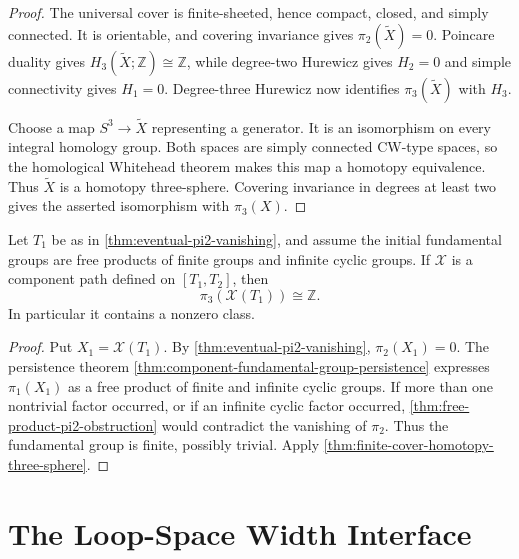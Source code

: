 \begin{proof}
The universal cover is finite-sheeted, hence compact, closed, and simply
connected.  It is orientable, and covering invariance gives
$\pi_2(\widetilde X)=0$.  Poincare duality gives
$H_3(\widetilde X;\mathbb Z)\cong\mathbb Z$, while degree-two Hurewicz gives
$H_2=0$ and simple connectivity gives $H_1=0$.  Degree-three Hurewicz now
identifies $\pi_3(\widetilde X)$ with $H_3$.

Choose a map $S^3\to\widetilde X$ representing a generator.  It is an
isomorphism on every integral homology group.  Both spaces are simply
connected CW-type spaces, so the homological Whitehead theorem makes this map
a homotopy equivalence.  Thus $\widetilde X$ is a homotopy three-sphere.
Covering invariance in degrees at least two gives the asserted isomorphism
with $\pi_3(X)$.
\end{proof}

\begin{theorem}
\label{thm:late-component-nontrivial-pi3}
\notready
Let $T_1$ be as in \ref{thm:eventual-pi2-vanishing}, and assume the initial
fundamental groups are free products of finite groups and infinite cyclic
groups.  If $\mathcal X$ is a component path defined on $[T_1,T_2]$, then
\[
 \pi_3(\mathcal X(T_1))\cong\mathbb Z.
\]
In particular it contains a nonzero class.
\end{theorem}

\begin{proof}
Put $X_1=\mathcal X(T_1)$.  By \ref{thm:eventual-pi2-vanishing},
$\pi_2(X_1)=0$.  The persistence theorem
\ref{thm:component-fundamental-group-persistence} expresses $\pi_1(X_1)$
as a free product of finite and infinite cyclic
groups.  If more than one nontrivial factor occurred, or if an infinite
cyclic factor occurred, \ref{thm:free-product-pi2-obstruction} would
contradict the vanishing of $\pi_2$.  Thus the fundamental group is finite,
possibly trivial.  Apply \ref{thm:finite-cover-homotopy-three-sphere}.
\end{proof}

\section{The Loop-Space Width Interface}


